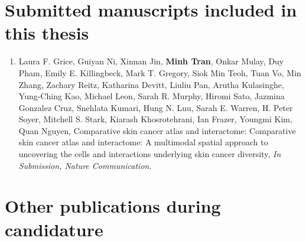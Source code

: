 \section*{Submitted manuscripts included in this thesis}

\begin{instructional}


    
    \begin{enumerate}

    
    
    \item Laura F. Grice, Guiyan Ni, Xinnan Jin, \textbf{Minh Tran}, Onkar Mulay, Duy Pham, Emily E. Killingbeck, Mark T. Gregory, Siok Min Teoh, Tuan Vo, Min Zhang, Zachary Reitz, Katharina Devitt, Liuliu Pan, Arutha Kulasinghe, Yung-Ching Kao, Michael Leon, Sarah R. Murphy, Hiromi Sato, Jazmina Gonzalez Cruz, Snehlata Kumari, Hung N. Luu, Sarah E. Warren, H. Peter Soyer, Mitchell S. Stark, Kiarash Khosrotehrani, Ian Frazer, Youngmi Kim, Quan Nguyen, Comparative skin cancer atlas and interactome: Comparative skin cancer atlas and interactome: A multi\-modal spatial approach to uncovering the cells and interactions underlying skin cancer diversity, \textit{In Submission, Nature Communication}.
    \end{enumerate}
\end{instructional}





\section*{Other publications during candidature}

